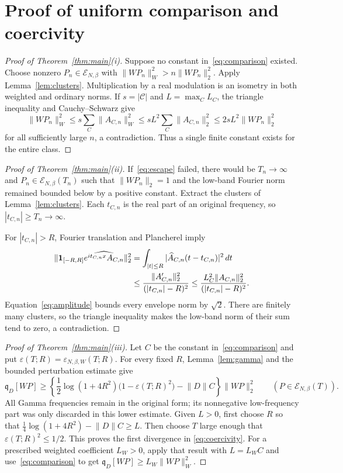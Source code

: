 \documentclass[11pt]{article}
\theoremstyle{definition}
\theoremstyle{remark}
\newcommand{\EE}{\mathcal E_{N,\beta}}
\newcommand{\qD}{\mathfrak q_D}
\newcommand{\norm}[1]{\lVert #1\rVert}
\begin{document}
\section{Proof of uniform comparison and coercivity}\label{sec:proof}

\begin{proof}[Proof of Theorem~\ref{thm:main}\textup{(i)}]
Suppose no constant in~\eqref{eq:comparison} existed. Choose nonzero
$P_n\in\EE$ with $\norm{WP_n}_W^2>n\norm{WP_n}_2^2$. Apply
Lemma~\ref{lem:clusters}. Multiplication by a real modulation is an
isometry in both weighted and ordinary norms. If $s=|\mathcal C|$ and
$L=\max_C L_C$, the triangle inequality and Cauchy--Schwarz give
\[
 \norm{WP_n}_W^2\le s\sum_C\norm{A_{C,n}}_W^2
 \le sL^2\sum_C\norm{A_{C,n}}_2^2
 \le2sL^2\norm{WP_n}_2^2
\]
for all sufficiently large $n$, a contradiction. Thus a single finite
constant exists for the entire class.
\end{proof}

\begin{proof}[Proof of Theorem~\ref{thm:main}\textup{(ii)}]
If~\eqref{eq:escape} failed, there would be $T_n\to\infty$ and
$P_n\in\EE(T_n)$ such that $\norm{WP_n}_2=1$ and the low-band Fourier
norm remained bounded below by a positive constant. Extract the clusters
of Lemma~\ref{lem:clusters}. Each $t_{C,n}$ is the real part of an original
frequency, so $|t_{C,n}|\ge T_n\to\infty$.

For $|t_{C,n}|>R$, Fourier translation and Plancherel imply
\begin{align}\label{eq:low-band}
 \norm{\mathbf1_{[-R,R]}
 \widehat{e^{it_{C,n}x}A_{C,n}}}_2^2
 &=\int_{|t|\le R}|\widehat A_{C,n}(t-t_{C,n})|^2\,dt\notag\\
 &\le\frac{\norm{A_{C,n}'}_2^2}{(|t_{C,n}|-R)^2}
 \le\frac{L_C^2\norm{A_{C,n}}_2^2}{(|t_{C,n}|-R)^2}.
\end{align}
Equation~\eqref{eq:amplitude} bounds every envelope norm by $\sqrt2$.
There are finitely many clusters, so the triangle inequality makes the
low-band norm of their sum tend to zero, a contradiction.
\end{proof}

\begin{proof}[Proof of Theorem~\ref{thm:main}\textup{(iii)}]
Let $C$ be the constant in~\eqref{eq:comparison} and put
$\varepsilon(T;R)=\varepsilon_{N,\beta,W}(T;R)$. For every fixed $R$,
Lemma~\ref{lem:gamma} and the bounded perturbation estimate give
\begin{equation}\label{eq:master-lower}
 \qD[WP]\ge\left\{
 \frac12\log(1+4R^2)\bigl(1-\varepsilon(T;R)^2\bigr)
 -\norm D C\right\}\norm{WP}_2^2
 \qquad(P\in\EE(T)).
\end{equation}
All Gamma frequencies remain in the original form; its nonnegative
low-frequency part was only discarded in this lower estimate. Given
$L>0$, first choose $R$ so that
$\tfrac14\log(1+4R^2)-\norm D C\ge L$. Then choose $T$ large enough
that $\varepsilon(T;R)^2\le1/2$. This proves the first divergence in
\eqref{eq:coercivity}. For a prescribed weighted coefficient $L_W>0$,
apply that result with $L=L_W C$ and use~\eqref{eq:comparison} to get
$\qD[WP]\ge L_W\norm{WP}_W^2$.
\end{proof}
\end{document}
